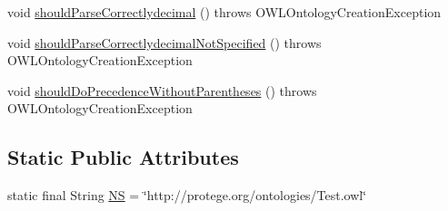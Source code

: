 \begin{DoxyCompactItemize}
\item 
void \hyperlink{classorg_1_1semanticweb_1_1owlapi_1_1api_1_1test_1_1syntax_1_1_manchester_o_w_l_syntax_parser_test_case_ab866daadf035ee19804152f709ba3644}{should\-Parse\-Correctlydecimal} ()  throws O\-W\-L\-Ontology\-Creation\-Exception 
\item 
void \hyperlink{classorg_1_1semanticweb_1_1owlapi_1_1api_1_1test_1_1syntax_1_1_manchester_o_w_l_syntax_parser_test_case_a264347fd5c4f5ec6a3fd09f09d0248e7}{should\-Parse\-Correctlydecimal\-Not\-Specified} ()  throws O\-W\-L\-Ontology\-Creation\-Exception 
\item 
void \hyperlink{classorg_1_1semanticweb_1_1owlapi_1_1api_1_1test_1_1syntax_1_1_manchester_o_w_l_syntax_parser_test_case_a2eac02554e2058b35e3515b54523a2d3}{should\-Do\-Precedence\-Without\-Parentheses} ()  throws O\-W\-L\-Ontology\-Creation\-Exception 
\end{DoxyCompactItemize}
\subsection*{Static Public Attributes}
\begin{DoxyCompactItemize}
\item 
static final String \hyperlink{classorg_1_1semanticweb_1_1owlapi_1_1api_1_1test_1_1syntax_1_1_manchester_o_w_l_syntax_parser_test_case_a7fbf47a4dcb9c7399b212db176d400fe}{N\-S} = \char`\"{}http\-://protege.\-org/ontologies/Test.\-owl\char`\"{}
\end{DoxyCompactItemize}


